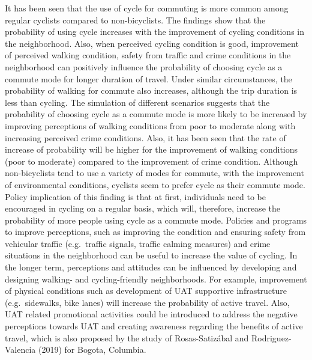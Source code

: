 \documentclass[]{elsarticle} %
\begin{document}
It has been seen that the use of cycle for commuting is more common
among regular cyclists compared to non-bicyclists. The findings show
that the probability of using cycle increases with the improvement of
cycling conditions in the neighborhood. Also, when perceived cycling
condition is good, improvement of perceived walking condition, safety
from traffic and crime conditions in the neighborhood can positively
influence the probability of choosing cycle as a commute mode for longer
duration of travel. Under similar circumstances, the probability of
walking for commute also increases, although the trip duration is less
than cycling. The simulation of different scenarios suggests that the
probability of choosing cycle as a commute mode is more likely to be
increased by improving perceptions of walking conditions from poor to
moderate along with increasing perceived crime conditions. Also, it has
been seen that the rate of increase of probability will be higher for
the improvement of walking conditions (poor to moderate) compared to the
improvement of crime condition. Although non-bicyclists tend to use a
variety of modes for commute, with the improvement of environmental
conditions, cyclists seem to prefer cycle as their commute mode. Policy
implication of this finding is that at first, individuals need to be
encouraged in cycling on a regular basis, which will, therefore,
increase the probability of more people using cycle as a commute mode.
Policies and programs to improve perceptions, such as improving the
condition and ensuring safety from vehicular traffic (e.g.~traffic
signals, traffic calming measures) and crime situations in the
neighborhood can be useful to increase the value of cycling. In the
longer term, perceptions and attitudes can be influenced by developing
and designing walking- and cycling-friendly neighborhoods. For example,
improvement of physical conditions such as development of UAT supportive
infrastructure (e.g.~sidewalks, bike lanes) will increase the
probability of active travel. Also, UAT related promotional activities
could be introduced to address the negative perceptions towards UAT and
creating awareness regarding the benefits of active travel, which is
also proposed by the study of Rosas-Satizábal and Rodriguez-Valencia
(2019) for Bogota, Columbia.
\end{document}

